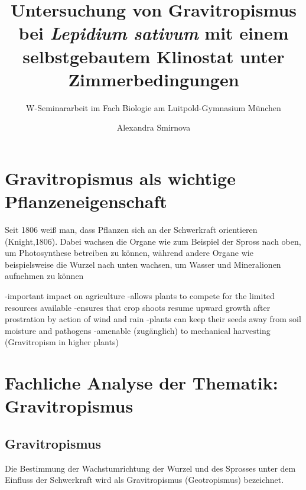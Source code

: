 \documentclass[
a4paper, 
11pt, 
ngerman,
listof=totoc,
bibliography=totocnumbered,
abstracton
]{scrreprt}
\title{Untersuchung von Gravitropismus bei \emph{Lepidium sativum} mit einem selbstgebautem Klinostat unter Zimmerbedingungen}
\subtitle{W-Seminararbeit im Fach Biologie am Luitpold-Gymnasium München}
\author{Alexandra Smirnova}
\begin{document}
	
\begingroup
\renewcommand*{\chapterpagestyle}{empty}
\pagestyle{empty}
\maketitle
\tableofcontents
\clearpage
\endgroup
	
\renewcommand\abstractname{Abstract}
\begin{abstract}
	
	
	
\end{abstract}


\chapter{Gravitropismus als wichtige Pflanzeneigenschaft}

	Seit 1806 weiß man, dass Pflanzen sich an der Schwerkraft orientieren (Knight,1806). Dabei wachsen die Organe wie zum Beispiel der Spross nach oben, um Photosynthese betreiben zu können, während andere Organe wie beispielsweise die Wurzel nach unten wachsen, um Wasser und Mineralionen aufnehmen zu können 
	
	-important impact on agriculture 
	-allows plants to compete for the limited resources available
	-ensures that crop shoots resume upward growth after prostration by action of wind and rain
	-plants can keep their seeds away from soil moisture and pathogens 
	-amenable (zugänglich) to mechanical harvesting 
	(Gravitropism in higher plants)





\chapter{Fachliche Analyse der Thematik: Gravitropismus}

\section{Gravitropismus}

Die Bestimmung der Wachstumrichtung der Wurzel und des Sprosses unter dem Einfluss der Schwerkraft wird als Gravitropismus (Geotropismus) bezeichnet.
\end{document}

